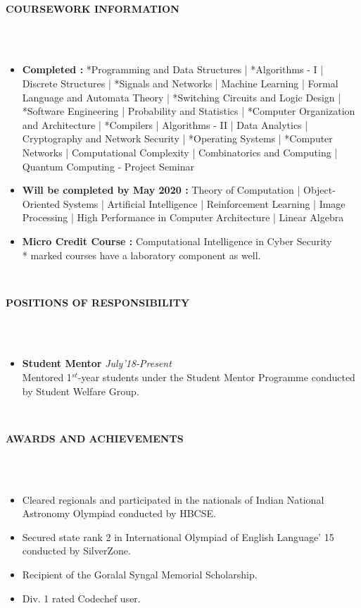 \documentclass[letter,10pt]{book}
\newcommand{\lsep}{-0.5cm}
\newcommand{\psep}{-0.6cm}
\newcommand{\resheading}[1]{{\small \colorbox{mygrey}{\begin{minipage}{0.975\textwidth}{\textbf{#1 \vphantom{p\^{E}}}}\end{minipage}}}}
\begin{document}
\hspace{0.5cm}\\[-0.2cm]
\resheading{\textbf{COURSEWORK INFORMATION} }\\[\lsep]
\\[-1em]
\begin{itemize}
\item \textbf{Completed : }*Programming and Data Structures | *Algorithms - I | Discrete Structures | *Signals and Networks | Machine Learning | Formal Language and Automata Theory | *Switching Circuits and Logic Design | *Software Engineering | Probability and Statistics | *Computer Organization and Architecture | *Compilers | Algorithms - II | Data Analytics | Cryptography and Network Security | *Operating Systems | *Computer Networks | Computational Complexity | Combinatorics and Computing | Quantum Computing - Project Seminar 
\\[\psep]
\item \textbf{Will be completed by May 2020 :}  Theory of Computation | Object-Oriented Systems | Artificial Intelligence | Reinforcement Learning | Image Processing | High Performance in Computer Architecture | Linear Algebra\\[\psep]
\item \textbf{Micro Credit Course :} Computational Intelligence in Cyber Security\\
{*} marked courses have a laboratory component as well.
\end{itemize}

\hspace{0.5cm}\\[-0.2cm]
\resheading{\textbf{POSITIONS OF RESPONSIBILITY} }\\[\lsep]
\\[-1em]
\begin{itemize}
\item \large \textbf{Student Mentor} \hfill \normalsize \textit{July'18-Present}  \\ 
Mentored 1$^{st} $-year students under the Student Mentor Programme conducted by Student Welfare Group.
\end{itemize}

\hspace{0.5cm}\\[-0.2cm]
\resheading{\textbf{AWARDS AND ACHIEVEMENTS} }\\[\lsep]
\\[-1em]
\begin{itemize}
\item Cleared regionals and participated in the nationals of Indian National Astronomy Olympiad conducted by HBCSE.
\\[\psep]
\item Secured state rank 2 in International Olympiad of English Language’ 15
conducted by SilverZone.
\\[\psep]
\item Recipient of the Goralal Syngal Memorial Scholarship.
\\[\psep]
\item Div. 1 rated Codechef user.
\end{itemize}
\end{document}
